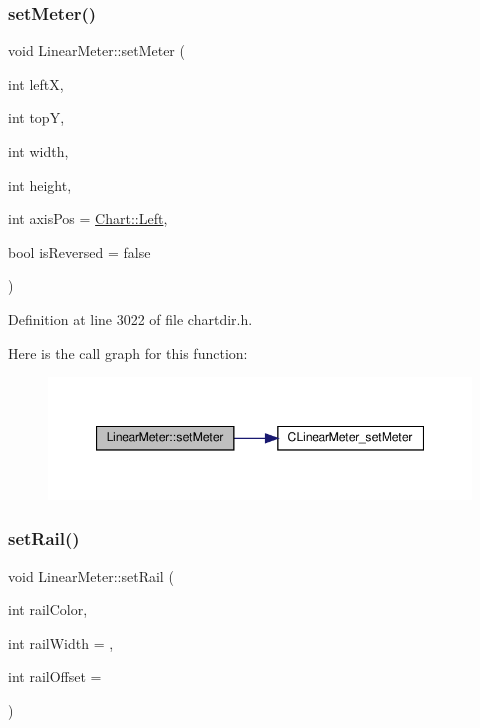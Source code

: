 \subsubsection{\texorpdfstring{set\+Meter()}{setMeter()}}
{\footnotesize\ttfamily void Linear\+Meter\+::set\+Meter (\begin{DoxyParamCaption}\item[{int}]{leftX,  }\item[{int}]{topY,  }\item[{int}]{width,  }\item[{int}]{height,  }\item[{int}]{axis\+Pos = {\ttfamily \hyperlink{namespace_chart_ae222e51ce11a254450b6ddfbc862680aae213f3cd1461b109f9aa955d28ed4418}{Chart\+::\+Left}},  }\item[{bool}]{is\+Reversed = {\ttfamily false} }\end{DoxyParamCaption})\hspace{0.3cm}{\ttfamily [inline]}}



Definition at line 3022 of file chartdir.\+h.

Here is the call graph for this function\+:
\nopagebreak
\begin{figure}[H]
\begin{center}
\leavevmode
\includegraphics[width=347pt]{class_linear_meter_a5c371b61604befc3d3459175740704af_cgraph}
\end{center}
\end{figure}
\mbox{\label{class_linear_meter_a3ea47754984830027c4f543f23226748}} 
\subsubsection{\texorpdfstring{set\+Rail()}{setRail()}}
{\footnotesize\ttfamily void Linear\+Meter\+::set\+Rail (\begin{DoxyParamCaption}\item[{int}]{rail\+Color,  }\item[{int}]{rail\+Width = {},  }\item[{int}]{rail\+Offset = {} }\end{DoxyParamCaption})\hspace{0.3cm}{\ttfamily [inline]}}



